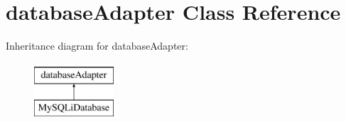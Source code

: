 \hypertarget{interfacedatabase_adapter}{
\section{databaseAdapter Class Reference}
\label{interfacedatabase_adapter}
}
Inheritance diagram for databaseAdapter:\begin{figure}[H]
\begin{center}
\leavevmode
\includegraphics[height=2.000000cm]{interfacedatabase_adapter}
\end{center}
\end{figure}
